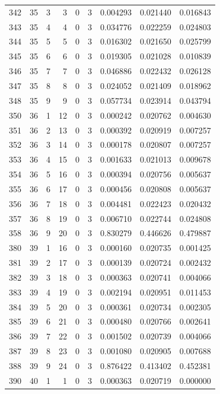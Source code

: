 \begin{longtable}{rrrrrrrrr}
342 & 35 & 3 & 3 & 0 & 3 & 0.004293 & 0.021440 & 0.016843 \\
343 & 35 & 4 & 4 & 0 & 3 & 0.034776 & 0.022259 & 0.024803 \\
344 & 35 & 5 & 5 & 0 & 3 & 0.016302 & 0.021650 & 0.025799 \\
345 & 35 & 6 & 6 & 0 & 3 & 0.019305 & 0.021028 & 0.010839 \\
346 & 35 & 7 & 7 & 0 & 3 & 0.046886 & 0.022432 & 0.026128 \\
347 & 35 & 8 & 8 & 0 & 3 & 0.024052 & 0.021409 & 0.018962 \\
348 & 35 & 9 & 9 & 0 & 3 & 0.057734 & 0.023914 & 0.043794 \\
350 & 36 & 1 & 12 & 0 & 3 & 0.000242 & 0.020762 & 0.004630 \\
351 & 36 & 2 & 13 & 0 & 3 & 0.000392 & 0.020919 & 0.007257 \\
352 & 36 & 3 & 14 & 0 & 3 & 0.000178 & 0.020807 & 0.007257 \\
353 & 36 & 4 & 15 & 0 & 3 & 0.001633 & 0.021013 & 0.009678 \\
354 & 36 & 5 & 16 & 0 & 3 & 0.000394 & 0.020756 & 0.005637 \\
355 & 36 & 6 & 17 & 0 & 3 & 0.000456 & 0.020808 & 0.005637 \\
356 & 36 & 7 & 18 & 0 & 3 & 0.004481 & 0.022423 & 0.020432 \\
357 & 36 & 8 & 19 & 0 & 3 & 0.006710 & 0.022744 & 0.024808 \\
358 & 36 & 9 & 20 & 0 & 3 & 0.830279 & 0.446626 & 0.479887 \\
380 & 39 & 1 & 16 & 0 & 3 & 0.000160 & 0.020735 & 0.001425 \\
381 & 39 & 2 & 17 & 0 & 3 & 0.000139 & 0.020724 & 0.002432 \\
382 & 39 & 3 & 18 & 0 & 3 & 0.000363 & 0.020741 & 0.004066 \\
383 & 39 & 4 & 19 & 0 & 3 & 0.002194 & 0.020951 & 0.011453 \\
384 & 39 & 5 & 20 & 0 & 3 & 0.000361 & 0.020734 & 0.002305 \\
385 & 39 & 6 & 21 & 0 & 3 & 0.000480 & 0.020766 & 0.002641 \\
386 & 39 & 7 & 22 & 0 & 3 & 0.001502 & 0.020739 & 0.004066 \\
387 & 39 & 8 & 23 & 0 & 3 & 0.001080 & 0.020905 & 0.007688 \\
388 & 39 & 9 & 24 & 0 & 3 & 0.876422 & 0.413402 & 0.452381 \\
390 & 40 & 1 & 1 & 0 & 3 & 0.000363 & 0.020719 & 0.000000 \\

\end{longtable}
